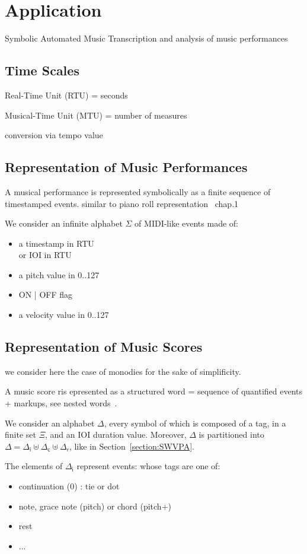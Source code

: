 \documentclass[a4paper,11pt]{article}
\def\Deltai{{\Delta_\mathsf{i}}}
\def\Deltac{{\Delta_\mathsf{c}}}
\def\Deltar{{\Delta_\mathsf{r}}}
\begin{document}
\section{Application}
Symbolic Automated Music Transcription
and analysis of music performances

\subsection{Time Scales}
Real-Time Unit (RTU) = seconds

\noindent 
Musical-Time Unit (MTU) = number of measures

\noindent 
conversion via tempo value

\subsection{Representation of Music Performances}
A musical performance is represented symbolically as a finite sequence of timestamped events.
similar to piano roll representation~\cite{Muller15fundamentals} chap.1 

\noindent
We consider an infinite alphabet $\Sigma$ of MIDI-like 
events made of:
\begin{itemize}
\item a timestamp in RTU\\ %
      or IOI in RTU
\item a pitch value in 0..127
\item ON | OFF flag
\item a velocity value in 0..127
\end{itemize}


\subsection{Representation of Music Scores}
we consider here the case of monodies for the sake of simplificity.

A music score ris epresented as a structured word
= sequence of quantified events + markups,
see nested words~\cite{AlurMadhusudan09nested}.

We consider an alphabet $\Delta$, every symbol of which is 
composed of a tag, in a finite set $\Xi$, 
and an IOI duration value.
Moreover, $\Delta$ is partitioned into 
$\Delta = \Deltai \uplus \Deltac \uplus \Deltar$, 
like in Section~\ref{section:SWVPA}.

\noindent
The elements of $\Deltai$ represent events:
whose tags are one of:
\begin{itemize}
\item continuation (0) : tie or dot
\item note, grace note (pitch) or chord (pitch+)
\item rest
\item ...
\end{itemize}
\end{document}
